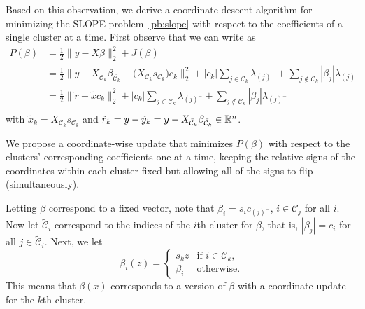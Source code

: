 Based on this observation, we derive a coordinate descent algorithm for minimizing the SLOPE problem~\eqref{pb:slope} with respect to the coefficients of a single cluster at a time.
First observe that we can write  as 
\[
  \begin{aligned}
    P(\beta)
     & =  \frac{1}{2} \lVert y - X\beta\rVert_2^2 + J(\beta)                        \\
     & = \frac{1}{2} \lVert y - X_{\bar{\mathcal{C}_k}} \beta_{\bar{\mathcal{C}_k}}
    - \big(X_{\mathcal{C}_k} s_{\mathcal{C}_k}\big)c_k  \rVert_2^2
    + |c_k|\sum_{j \in {\mathcal{C}_k}} \lambda_{(j)^-}
    + \sum_{j \notin {\mathcal{C}_k}} |\beta_j|\lambda_{(j)^-}                      \\
     & = \frac{1}{2} \lVert \tilde r - \tilde x c_k \rVert_2^2
    + |c_k|\sum_{j \in {\mathcal{C}_k}} \lambda_{(j)^-}
    + \sum_{j \notin {\mathcal{C}_k}} |\beta_j|\lambda_{(j)^-}                      \\
  \end{aligned}
\]
with \( \tilde x_k = X_{\mathcal{C}_k} s_{\mathcal{C}_k}\) and
\(\tilde r_k = y - \tilde y_k = y - X_{\bar{\mathcal{C}}_k} \beta_{\bar{\mathcal{C}}_k} \in \mathbb{R}^n\).

We propose a coordinate-wise update that minimizes \(P(\beta)\) with respect to the
clusters' corresponding coefficients one at a time, keeping the relative signs
of the coordinates within each cluster fixed but allowing all of the signs to
flip (simultaneously).

Letting \(\beta\) correspond to a fixed vector, note that
\(\beta_i = s_i c_{(j)^-}\), \(i \in \mathcal{C}_j\) for all
\(i\). Now let \(\tilde{\mathcal{C}}_i\)
correspond to the indices of the \(i\)th cluster for \(\beta\), that is,
\(|\beta_j| = c_i\) for all \(j \in \tilde{\mathcal{C}}_i\).
Next, we let
\begin{equation}
  \label{eq:coordinate-update-beta}
  \beta_i(z) =
  \begin{cases}
    s_k z   & \text{if } i \in \mathcal{C}_k, \\
    \beta_i & \text{otherwise.}
  \end{cases}
\end{equation}
This means that \(\beta(x)\) corresponds to a version of \(\beta\) with a
coordinate update for the \(k\)th cluster.

